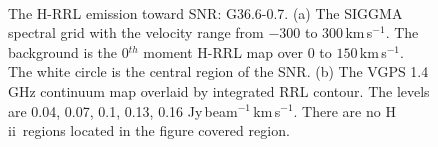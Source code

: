 \documentclass[manuscript]{aastex61}
\newcommand{\hii}{{\rm H\,}{{\sc ii}}}
\newcommand{\kms}{\,km\,s$^{-1}$}
\begin{document}
\begin{figure}[H]
	\centering
	\\
	\caption{The H-RRL emission toward SNR: G36.6-0.7.
	(a) The SIGGMA spectral grid with the velocity range from $-300$ to $300$\kms.
	The background is the 0$^{th}$ moment H-RRL map over $0$ to $150$\kms.
	The white circle is the central region of the SNR.
	(b) The VGPS 1.4 GHz continuum map overlaid by integrated RRL contour.
	The levels are 0.04, 0.07, 0.1, 0.13, 0.16 Jy\,beam$^{-1}$\kms.
	There are no \hii\ regions located in the figure covered region.
	}
	\label{fig_snr-g366}
\end{figure}
\end{document}
